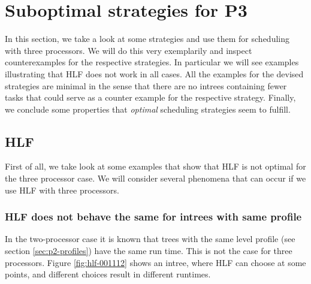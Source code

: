 \chapter{Suboptimal strategies for P3}
\label{chap:p3-suboptimal}

In this section, we take a look at some strategies and use them for scheduling with three processors. We will do this very exemplarily and inspect counterexamples for the respective strategies. In particular we will see examples illustrating that HLF does not work in all cases. All the examples for the devised strategies are minimal in the sense that there are no intrees containing fewer tasks that could serve as a counter example for the respective strategy.
Finally, we conclude some properties that \emph{optimal} scheduling strategies seem to fulfill.

\section{HLF}
\label{sec:hlf-p3-suboptimal}

First of all, we take look at some examples that show that HLF is not optimal for the three processor case. We will consider several phenomena that can occur if we use HLF with three processors.

\subsection{HLF does not behave the same for intrees with same profile}
\label{sec:p3-suboptimal-hlf-same-profiles-different-run-times}

In the two-processor case it is known that trees with the same level profile (see section \ref{sec:p2-profiles}) have the same run time. This is not the case for three processors. Figure \ref{fig:hlf-001112} shows an intree, where HLF can choose at some points, and different choices result in different runtimes.

